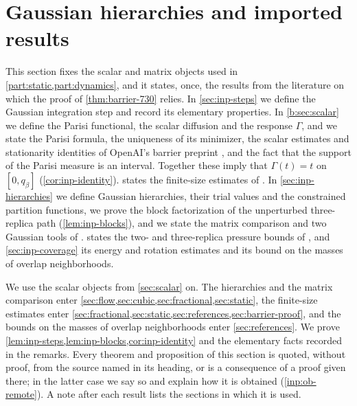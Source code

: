 \chapter{Gaussian hierarchies and imported results}\label{sec:inputs}

This section fixes the scalar and matrix objects used in
\cref{part:static,part:dynamics}, and it states, once, the results from the
literature on which the proof of \cref{thm:barrier-730} relies. In
\cref{sec:inp-steps} we define the Gaussian integration step and record its
elementary properties. In \cref{b:sec:scalar} we define the Parisi functional,
the scalar diffusion and the response $\Gamma$, and we state the Parisi formula,
the uniqueness of its minimizer, the scalar estimates and stationarity
identities of OpenAI's barrier preprint \cite{oai-barriers}, and the fact that the support
of the Parisi measure is an interval. Together these imply that $\Gamma(t)=t$ on
$[0,q_\beta]$ (\cref{cor:inp-identity}).  states the
finite-size estimates of \cite{quantitative-parisi,hexagon-bias}. In
\cref{sec:inp-hierarchies} we define Gaussian hierarchies, their trial values
and the constrained partition functions, we prove the block factorization of
the unperturbed three-replica path (\cref{lem:inp-blocks}), and we state the
matrix comparison and two Gaussian tools of \cite{oai-barriers}.
 states the two- and three-replica pressure bounds of
\cite{oai-barriers}, and \cref{sec:inp-coverage} its energy and rotation
estimates and its bound on the masses of overlap neighborhoods.

We use the scalar objects from \cref{sec:scalar} on. The hierarchies and the
matrix comparison enter \cref{sec:flow,sec:cubic,sec:fractional,sec:static},
the finite-size estimates enter
\cref{sec:fractional,sec:static,sec:references,sec:barrier-proof},
and the bounds on the masses of overlap neighborhoods enter
\cref{sec:references}. We prove
\cref{lem:inp-steps,lem:inp-blocks,cor:inp-identity} and the elementary facts
recorded in the remarks. Every theorem and proposition of this section is
quoted, without proof, from the source named in its heading, or is a consequence
of a proof given there; in the latter case we say so and explain how it is
obtained (\cref{inp:ob-remote}). A note after each result lists the sections
in which it is used.

